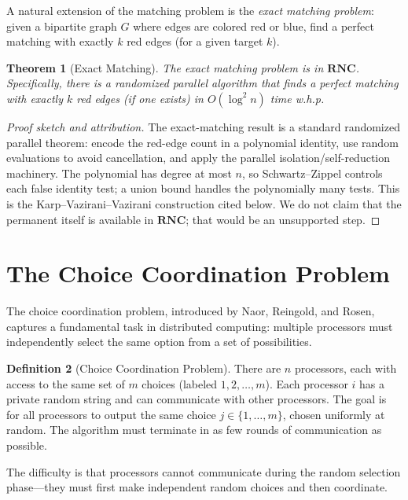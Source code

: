 \documentclass[twoside,12pt]{book}
\theoremstyle{plain}
\newtheorem{theorem}{Theorem}[chapter]
\theoremstyle{definition}
\newtheorem{definition}[theorem]{Definition}
\theoremstyle{remark}
\begin{document}
A natural extension of the matching problem is the \emph{exact matching problem}: given a bipartite graph $G$ where edges are colored red or blue, find a perfect matching with exactly $k$ red edges (for a given target $k$).

\begin{theorem}[Exact Matching]
\label{thm:exact-matching}
The exact matching problem is in $\mathbf{RNC}$. Specifically, there is a randomized parallel algorithm that finds a perfect matching with exactly $k$ red edges (if one exists) in $O(\log^2 n)$ time w.h.p.
\end{theorem}

\begin{proof}[Proof sketch and attribution]
The exact-matching result is a standard randomized parallel theorem: encode
the red-edge count in a polynomial identity, use random evaluations to avoid
cancellation, and apply the parallel isolation/self-reduction machinery. The
polynomial has degree at most $n$, so Schwartz--Zippel controls each false
identity test; a union bound handles the polynomially many tests. This is the
Karp--Vazirani--Vazirani construction cited below. We do not claim that the
permanent itself is available in $\mathbf{RNC}$; that would be an unsupported
step.
\end{proof}

\section{The Choice Coordination Problem}
\label{sec:choice-coordination}

The choice coordination problem, introduced by Naor, Reingold, and Rosen, captures a fundamental task in distributed computing: multiple processors must independently select the same option from a set of possibilities.

\begin{definition}[Choice Coordination Problem]
\label{def:choice-coordination}
There are $n$ processors, each with access to the same set of $m$ choices (labeled $1, 2, \ldots, m$). Each processor $i$ has a private random string and can communicate with other processors. The goal is for all processors to output the same choice $j \in \{1, \ldots, m\}$, chosen uniformly at random. The algorithm must terminate in as few rounds of communication as possible.
\end{definition}

The difficulty is that processors cannot communicate during the random selection phase---they must first make independent random choices and then coordinate.
\end{document}
